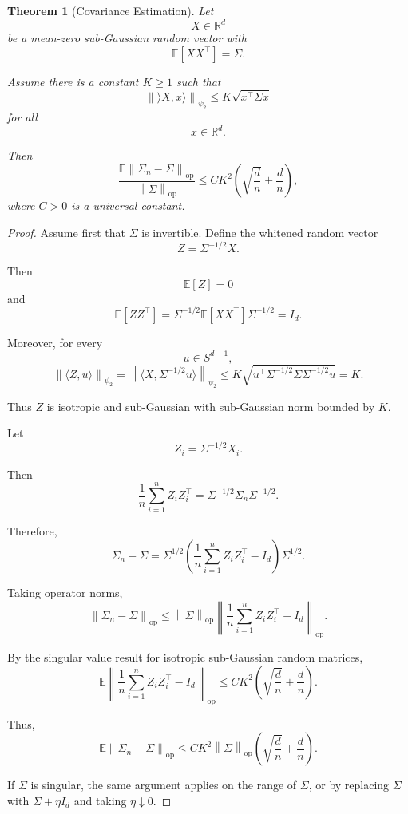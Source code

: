 \documentclass[12pt,oneside]{book}
\numberwithin{equation}{section}
\theoremstyle{definition}
\theoremstyle{plain}
\newtheorem{theorem}{Theorem}[section]
\theoremstyle{remark}
\newcommand{\R}{\mathbb{R}}
\newcommand{\E}{\mathbb{E}}
\newcommand{\norm}[1]{\left\lVert #1 \right\rVert}
\begin{document}
\begin{theorem}[Covariance Estimation]
Let
\[
X\in\R^d
\]
be a mean-zero sub-Gaussian random vector with
\[
\E[XX^\top]=\Sigma.
\]

Assume there is a constant $K\geq1$ such that
\[
\norm{\rangle X,x \rangle}_{\psi_2}
\leq
K\sqrt{x^\top\Sigma x}
\]
for all
\[
x\in\R^d.
\]

Then
\[
\frac{
\E\norm{\Sigma_n-\Sigma}_{\mathrm{op}}
}{
\norm{\Sigma}_{\mathrm{op}}
}
\leq
CK^2
\left(
\sqrt{\frac{d}{n}}
+
\frac{d}{n}
\right),
\]
where $C>0$ is a universal constant.
\end{theorem}

\begin{proof}
Assume first that $\Sigma$ is invertible. Define the whitened random vector
\[
Z=\Sigma^{-1/2}X.
\]

Then
\[
\E[Z]=0
\]
and
\[
\E[ZZ^\top]
=
\Sigma^{-1/2}\E[XX^\top]\Sigma^{-1/2}
=
I_d.
\]

Moreover, for every
\[
u\in S^{d-1},
\]
\[
\norm{\langle Z,u \rangle }_{\psi_2}
=
\norm{\langle X,\Sigma^{-1/2}u\rangle }_{\psi_2}
\leq
K\sqrt{
u^\top\Sigma^{-1/2}\Sigma\Sigma^{-1/2}u
}
=
K.
\]

Thus $Z$ is isotropic and sub-Gaussian with sub-Gaussian norm bounded by $K$.

Let
\[
Z_i=\Sigma^{-1/2}X_i.
\]

Then
\[
\frac{1}{n}\sum_{i=1}^n Z_iZ_i^\top
=
\Sigma^{-1/2}\Sigma_n\Sigma^{-1/2}.
\]

Therefore,
\[
\Sigma_n-\Sigma
=
\Sigma^{1/2}
\left(
\frac{1}{n}\sum_{i=1}^n Z_iZ_i^\top-I_d
\right)
\Sigma^{1/2}.
\]

Taking operator norms,
\[
\norm{\Sigma_n-\Sigma}_{\mathrm{op}}
\leq
\norm{\Sigma}_{\mathrm{op}}
\left\|
\frac{1}{n}\sum_{i=1}^n Z_iZ_i^\top-I_d
\right\|_{\mathrm{op}}.
\]

By the singular value result for isotropic sub-Gaussian random matrices,
\[
\E
\left\|
\frac{1}{n}\sum_{i=1}^n Z_iZ_i^\top-I_d
\right\|_{\mathrm{op}}
\leq
CK^2
\left(
\sqrt{\frac{d}{n}}
+
\frac{d}{n}
\right).
\]

Thus,
\[
\E\norm{\Sigma_n-\Sigma}_{\mathrm{op}}
\leq
CK^2\norm{\Sigma}_{\mathrm{op}}
\left(
\sqrt{\frac{d}{n}}
+
\frac{d}{n}
\right).
\]

If $\Sigma$ is singular, the same argument applies on the range of $\Sigma$, or by replacing $\Sigma$ with $\Sigma+\eta I_d$ and taking $\eta\downarrow0$.
\end{proof}
\end{document}

